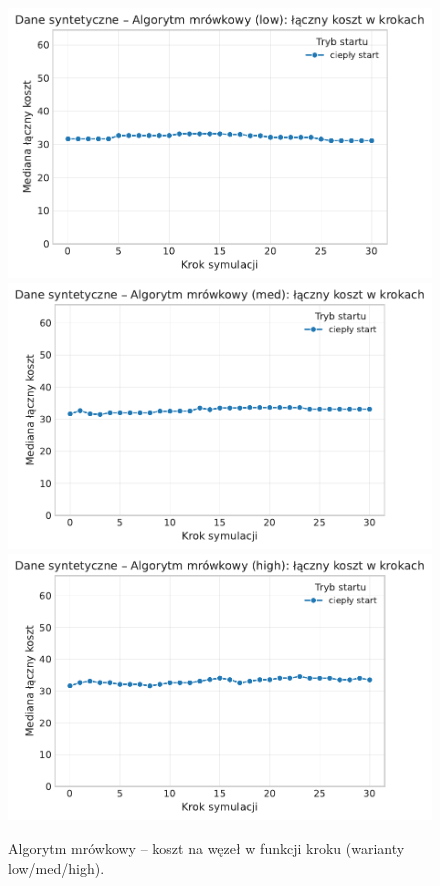 \begin{figure}[H]
  \centering
  \includegraphics[width=0.62\linewidth]{assets/figures/dynamic/synthetic/synthetic_algorytm_mrowkowy_cost_over_steps_low.pdf}\\[0.4em]
  \includegraphics[width=0.62\linewidth]{assets/figures/dynamic/synthetic/synthetic_algorytm_mrowkowy_cost_over_steps_med.pdf}\\[0.4em]
  \includegraphics[width=0.62\linewidth]{assets/figures/dynamic/synthetic/synthetic_algorytm_mrowkowy_cost_over_steps_high.pdf}
  \caption{Algorytm mrówkowy -- koszt na węzeł w funkcji kroku (warianty low/med/high).}
  \label{fig:dyn-synth-aco-cost}
\end{figure}


